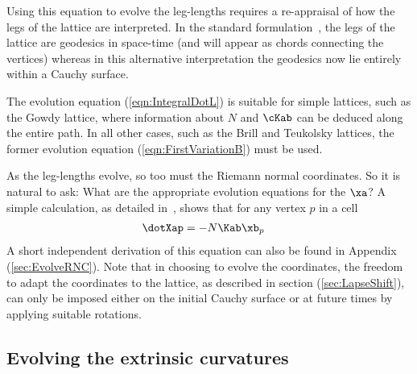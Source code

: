 \documentclass[a4paper,12pt]{article}
\numberwithin{equation}{section}
\begin{document}
Using this equation to evolve the leg-lengths requires a re-appraisal of how the legs of the
lattice are interpreted. In the standard formulation~\cite{brewin:2014-01}, the legs of the
lattice are geodesics in space-time (and will appear as chords connecting the vertices)
whereas in this alternative interpretation the geodesics now lie entirely within a Cauchy
surface.

The evolution equation (\ref{eqn:IntegralDotL}) is suitable for simple lattices, such as the
Gowdy lattice, where information about $N$ and $\cKab$ can be deduced along the entire path.
In all other cases, such as the Brill and Teukolsky lattices, the former evolution equation
(\ref{eqn:FirstVariationB}) must be used.

As the leg-lengths evolve, so too must the Riemann normal coordinates. So it is natural to
ask: What are the appropriate evolution equations for the $\xa$? A simple calculation, as
detailed in~\cite{brewin:2014-01}, shows that for any vertex $p$ in a cell
\begin{align}
\label{eqn:DotLegsA}
\dotXap
   &= - N \Kab \xb_p
\end{align}
A short independent derivation of this equation can also be found in Appendix
(\ref{sec:EvolveRNC}). Note that in choosing to evolve the coordinates, the freedom to adapt
the coordinates to the lattice, as described in section (\ref{sec:LapseShift}), can only be
imposed either on the initial Cauchy surface or at future times by applying suitable
rotations.

\subsection{Evolving the extrinsic curvatures}
\label{sec:DotKab}
\end{document}
